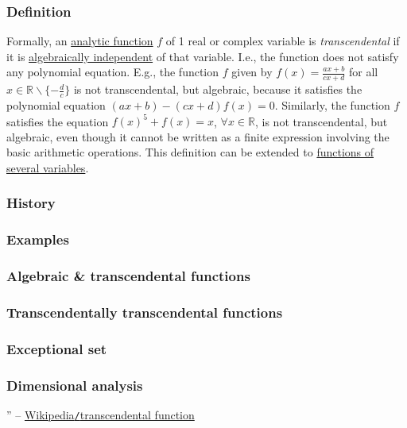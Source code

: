 \documentclass{article}
\begin{document}
\subsubsection{Definition}
Formally, an \href{https://en.wikipedia.org/wiki/Analytic_function}{analytic function} $f$ of 1 real or complex variable is {\it transcendental} if it is \href{https://en.wikipedia.org/wiki/Algebraically_independent}{algebraically independent} of that variable. I.e., the function does not satisfy any polynomial equation. E.g., the function $f$ given by $f(x) = \frac{ax + b}{cx + d}$ for all $x\in\mathbb{R}\backslash\{-\frac{d}{c}\}$ is not transcendental, but algebraic, because it satisfies the polynomial equation $(ax + b) - (cx + d)f(x) = 0$. Similarly, the function $f$ satisfies the equation $f(x)^5 + f(x) = x$, $\forall x\in\mathbb{R}$, is not transcendental, but algebraic, even though it cannot be written as a finite expression involving the basic arithmetic operations. This definition can be extended to \href{https://en.wikipedia.org/wiki/Function_of_several_real_variables}{functions of several variables}.

\subsubsection{History}

\subsubsection{Examples}

\subsubsection{Algebraic \& transcendental functions}

\subsubsection{Transcendentally transcendental functions}

\subsubsection{Exceptional set}

\subsubsection{Dimensional analysis}

'' -- \href{https://en.wikipedia.org/wiki/Transcendental_function}{Wikipedia{\tt/}transcendental function}
\end{document}
